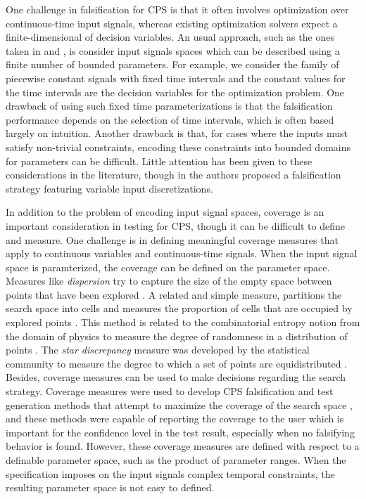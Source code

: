 One challenge in falsification for CPS is that it often
involves optimization over continuous-time input signals, whereas
existing optimization solvers expect a finite-dimensional of decision variables. 
An usual approach, such as the ones taken in \cite{BreachCAV10} and 
\cite{Nghiem10}, is consider input signals spaces which can be described using a
finite number of bounded parameters. For example, we consider the family of
piecewise constant signals with fixed time intervals and the
constant values for the time intervals are the decision variables for the optimization
problem. One drawback of using such fixed time parameterizations 
is that the falsification performance depends on the selection of time intervals, 
which is often based largely on intuition. Another drawback is that, for cases where the
inputs must satisfy non-trivial constraints, encoding these constraints 
into bounded domains for parameters can be difficult. Little attention has
been given to these considerations in the literature, though in 
\cite{DBLP:conf/atva/DeshmukhJKM15} the authors proposed a
falsification strategy featuring variable input discretizations.

In addition to the problem of encoding input signal spaces, coverage is an important consideration in testing for CPS, though it can be 
difficult to define and measure.
One challenge is in defining meaningful coverage measures that apply to continuous
variables and continuous-time signals. When the input signal space is paramterized, the coverage can be defined on the parameter space. 
Measures like \emph{dispersion} try to capture the size of the empty space between points that have been explored \cite{Esposito04}.
A related and simple measure, partitions the search space into cells and measures the proportion of cells that are occupied by explored points \cite{Skruch2011}.
This method is related to the combinatorial entropy notion from the domain of physics to measure the degree of randomness in a distribution of points \cite{Gabbay06}.
The \emph{star discrepancy} measure was developed by the statistical community 
to measure the degree to which a set of points are equidistributed
\cite{Heinrich03}. 
Besides, coverage measures can be used to make decisions regarding the search strategy. Coverage measures were used to develop CPS falsification and test generation methods that attempt to maximize the coverage of the search space \cite{DangN09,Dreossi2015,CAV2017}, and these methods were capable of reporting the coverage to the user which is important for the confidence level in the test result, especially when no falsifying behavior is found. However, these coverage measures are defined with respect to a definable parameter space, such as the product of parameter ranges. When the specification imposes on the input signals complex temporal constraints, the resulting parameter space is not easy to defined.


